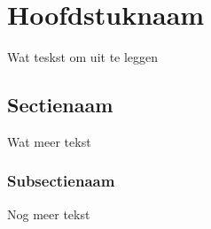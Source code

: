 \chapter{Hoofdstuknaam}
Wat teskst om uit te leggen
\section{Sectienaam}
Wat meer tekst
\subsection{Subsectienaam}
Nog meer tekst
